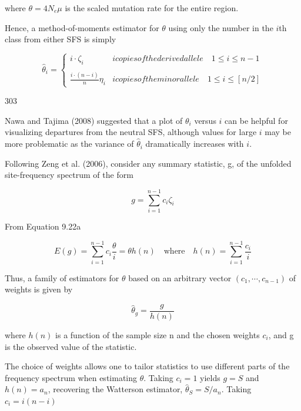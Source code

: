 \documentclass{article}
\begin{document}
where  $ \theta = 4N_{e}\mu $ is the scaled mutation rate for the entire region.

Hence, a method-of-moments estimator for  $ \theta $ using only the number in the  $ i $th class from either SFS is simply

\begin{equation}
\widehat{\theta}_{i}=\left\{\begin{array}{ll}i\cdot\zeta_{i}&i copies of the derived allele\quad1\leq i\leq n-1\\ &\\ \frac{i\cdot(n-i)}{n}\eta_{i}&i copies of the minor allele\quad1\leq i\leq[n/2]\end{array}\right.
\tag{9.22b}
\label{eq:9_22b}
\end{equation}

303

Nawa and Tajima (2008) suggested that a plot of  $ \theta_i $ versus  $ i $ can be helpful for visualizing departures from the neutral SFS, although values for large  $ i $ may be more problematic as the variance of  $ \widehat{\theta}_i $ dramatically increases with  $ i $.

Following Zeng et al. (2006), consider any summary statistic, g, of the unfolded site-frequency spectrum of the form

\begin{equation}
g=\sum_{i=1}^{n-1}c_{i}\zeta_{i}
\tag{9.23a}
\label{eq:9_23a}
\end{equation}

From Equation 9.22a

\begin{equation}
E(g)=\sum_{i=1}^{n-1}c_{i}\frac{\theta}{i}=\theta h(n)\quad\mathrm{w h e r e}\quad h(n)=\sum_{i=1}^{n-1}\frac{c_{i}}{i}
\tag{9.23b}
\label{eq:9_23b}
\end{equation}

Thus, a family of estimators for $\theta$ based on an arbitrary vector $(c_{1},\cdots,c_{n-1})$ of weights is given by

\begin{equation}
\widehat{\theta}_{g}=\frac{g}{h(n)}
\tag{9.23c}
\label{eq:9_23c}
\end{equation}

where  $ h(n) $ is a function of the sample size n and the chosen weights  $ c_{i} $, and g is the observed value of the statistic.

The choice of weights allows one to tailor statistics to use different parts of the frequency spectrum when estimating  $ \theta $. Taking  $ c_i = 1 $ yields  $ g = S $ and  $ h(n) = a_n $, recovering the Watterson estimator,  $ \widehat{\theta}_S = S/a_n $. Taking  $ c_i = i(n - i) $
\end{document}
